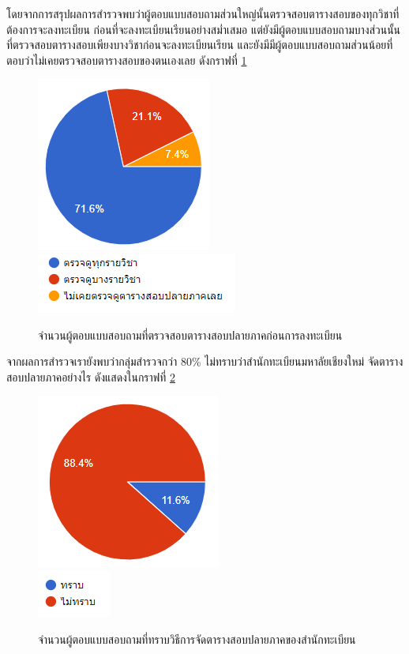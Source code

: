 โดยจากการสรุปผลการสำรวจพบว่าผู้ตอบแบบสอบถามส่วนใหญ่นั้นตรวจสอบตารางสอบของทุกวิชาที่ต้องการจะลงทะเบียน
ก่อนที่จะลงทะเบียนเรียนอย่างสม่ำเสมอ แต่ยังมีผู้ตอบแบบสอบถามบางส่วนนั้นที่ตรวจสอบตารางสอบเพียงบางวิชาก่อนจะลงทะเบียนเรียน และยังมีมีผู้ตอบแบบสอบถามส่วนน้อยที่ตอบว่าไม่เคยตรวจสอบตารางสอบของตนเองเลย ดังกราฟที่ \ref{fig:check_before_enrollment}
\begin{figure}
  \begin{center}
    \includegraphics{images/checking_schedule_before_enrollment.png}\\[2ex]
    \includegraphics{images/legend_for_checking_schedule_before_enrollment.png}
  \end{center}
  \caption[จำนวนผู้ตอบแบบสอบถามที่ตรวจสอบตารางสอบปลายภาคก่อนการลงทะเบียน]{จำนวนผู้ตอบแบบสอบถามที่ตรวจสอบตารางสอบปลายภาคก่อนการลงทะเบียน}
  \label{fig:check_before_enrollment}     
\end{figure}
จากผลการสำรวจเรายังพบว่ากลุ่มสำรวจกว่า 80\% ไม่ทราบว่าสำนักทะเบียนมหาลัยเชียงใหม่ จัดตารางสอบปลายภาคอย่างไร ดังแสดงในกราฟที่ \ref{fig:registration_exam}
\begin{figure}
  \begin{center}
    \includegraphics{images/registration_exam.png}\\[2ex]
    \includegraphics{images/legend_for_registration_exam.png}
  \end{center}
  \caption[จำนวนผู้ตอบแบบสอบถามที่ทราบวิธีการจัดตารางสอบปลายภาคของสำนักทะเบียน]{จำนวนผู้ตอบแบบสอบถามที่ทราบวิธีการจัดตารางสอบปลายภาคของสำนักทะเบียน}
  \label{fig:registration_exam}     
\end{figure}
